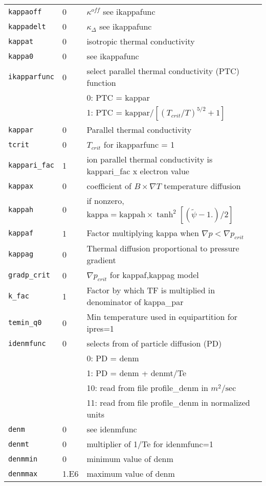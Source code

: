 \begin{tabular}{llp{4.0in}}
 \texttt{kappaoff}    & 0 & $\kappa^{off}$ see ikappafunc \\
 \texttt{kappadelt}   & 0 & $\kappa_{\Delta} $ see ikappafunc \\
 \texttt{kappat}      & 0 & isotropic thermal conductivity \\
 \texttt{kappa0}      & 0 & see ikappafunc \\
 \texttt{ikapparfunc} & 0 &  select parallel thermal conductivity (PTC) function \\
                      &   & 0: PTC = kappar  \\
                      &   & 1: PTC = $\mbox{kappar}/  \left[ (T_{crit}/T)^{5/2} + 1   \right] $ \\
 \texttt{kappar} & 0 & Parallel thermal conductivity\\
 \texttt{tcrit}  & 0 & $T_{crit}$ for ikapparfunc = 1  \\

 \texttt{kappari\_fac}& 1 & ion parallel thermal conductivity is kappari\_fac x electron value \\
 \texttt{kappax}      & 0 & coefficient of $B \times \nabla T$ temperature diffusion \\
 \texttt{kappah}      & 0 & if nonzero, $\mbox{kappa} = \mbox{kappah} \times \tanh^2 \left[ (\tilde{\psi}-1.)/2  \right] $ \\
  \texttt{kappaf} & 1 & Factor multiplying kappa when $\nabla p < \nabla p_{crit} $ \\
  \texttt{kappag} & 0 & Thermal diffusion proportional to pressure gradient \\
  \texttt{gradp\_crit} & 0 & $\nabla p_{crit} $ for kappaf,kappag model \\
  \texttt{k\_fac} & 1 & Factor by which TF is multiplied in denominator of kappa\_par \\
  \texttt{temin\_q0}  & 0 & Min temperature used in equipartition for ipres=1 \\
  \hline
  \texttt{idenmfunc}   & 0 & selects from of particle diffusion (PD) \\
                      &   &  0: PD = denm \\
                      &   &  1: PD = denm + denmt/Te \\
                      &   &  10: read from file profile\_denm in $m^2/\mbox{sec}$  \\
                      &   &  11: read from file profile\_denm in normalized units \\
  \texttt{denm}   & 0 &   see idenmfunc \\
  \texttt{denmt}  & 0 &  multiplier of 1/Te for idenmfunc=1 \\
  \texttt{denmmin} & 0 & minimum value of denm \\
  \texttt{denmmax} & 1.E6 & maximum value of denm \\
 
\end{tabular}

